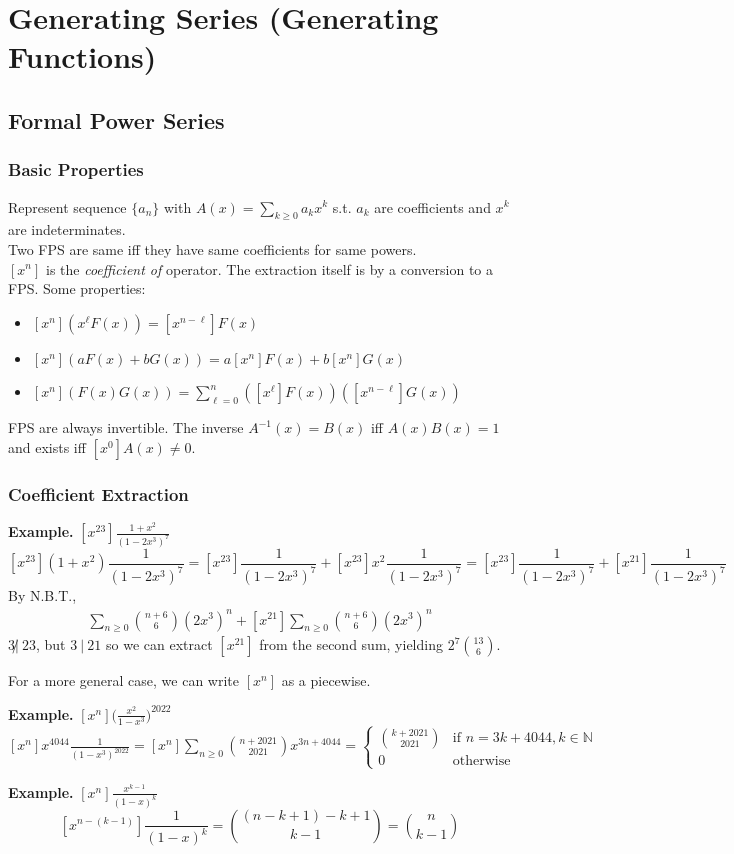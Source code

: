 \documentclass[11pt]{article}
\newenvironment{eg}[1]{
\begin{tcolorbox}[colback = white!15, arc=0pt,outer arc=0pt, colframe = black]
{\color{black} \textbf{Example.} #1} \\[5pt]
}
{
\end{tcolorbox}
}
\newcommand{\nl}{\\[5pt]}
\begin{document}
\newpage

\section{Generating Series (Generating Functions)}
\subsection{Formal Power Series}
\subsubsection{Basic Properties}

Represent sequence $\{a_n\}$ with $A(x) = \sum_{k \geq 0} a_kx^k$ s.t. $a_k$ are coefficients and $x^k$ are indeterminates. 
\nl
Two FPS are same iff they have same coefficients for same powers. \nl 
$[x^n]$ is the {\it{coefficient of}} operator. The extraction itself is by a conversion to a FPS. Some properties:
\begin{itemize}
    \setlength\itemsep{1pt}
    \item $[x^n](x^\ell F(x)) = [x^{n-\ell}]F(x)$ 
    \item $[x^n](aF(x) + bG(x)) = a[x^n]F(x) + b[x^n]G(x)$
    \item $[x^n](F(x)G(x)) = \sum_{\ell = 0}^n ([x^\ell] F(x))([x^{n-\ell}] G(x))$
\end{itemize}
 FPS are always invertible. The inverse $A^{-1}(x) = B(x)$ iff $A(x)B(x) = 1$ and exists iff $[x^0]A(x) \neq 0$.
\subsubsection{Coefficient Extraction}
\begin{eg}{$[x^{23}]\frac{1+x^2}{(1-2x^3)^7}$}
$$[x^{23}](1+x^2)\frac{1}{(1-2x^3)^7} = [x^{23}] \frac{1}{(1-2x^3)^7} + [x^{23}]x^2\frac{1}{(1-2x^3)^7} = [x^{23}] \frac{1}{(1-2x^3)^7} + [x^{21}]\frac{1}{(1-2x^3)^7}$$
By N.B.T., 
\begin{align*}
    [x^{23}]\sum_{n \geq 0} \binom{n + 6}{6} (2x^3)^n + [x^{21}]\sum_{n \geq 0} \binom{n + 6}{6} (2x^3)^n
\end{align*}
$3 \not| \: 23$, but $3 \: | \: 21$ so we can extract $[x^{21}]$ from the second sum, yielding $2^{7}\binom{13}{6}$. 
\end{eg}

For a more general case, we can write $[x^n]$ as a piecewise. 
\begin{eg}{$[x^n]\bigg(\frac{x^2}{1-x^3}\bigg)^{2022}$}
    $[x^n] x^{4044} \frac{1}{(1-x^3)^{2022}} = [x^n] \sum_{n \geq 0} \binom{n + 2021}{2021} x^{3n+4044} = \begin{cases} 
        \binom{k + 2021}{2021} &\text{if } n = 3k + 4044, k \in \mathbb{N}\\
        0 &\text{otherwise}
    \end{cases}$ 
\end{eg}
\begin{eg}{$[x^n]\frac{x^{k-1}}{(1-x)^k}$}
$$[x^{n-(k-1)}]\frac{1}{(1-x)^k} = \binom{(n-k+1)-k+1}{k-1} = \binom{n}{k-1}$$
\end{eg}
\end{document}
